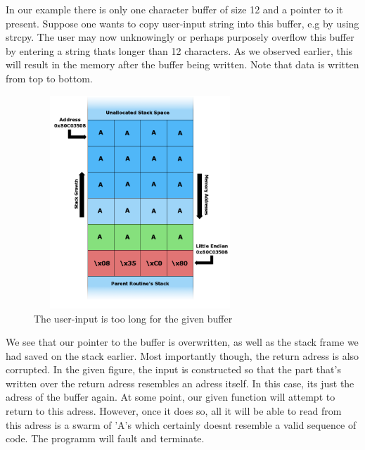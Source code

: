 \documentclass[10pt,twocolumn,a4paper]{article}
\begin{document}
In our example there is only one character buffer of size 12 and a pointer to it present.
\newline Suppose one wants to copy user-input string into this buffer, e.g by using strcpy.
The user may now unknowingly or perhaps purposely overflow this buffer by entering a string thats longer than 12 characters.
As we observed earlier, this will result in the memory after the buffer being written. Note that data is written from top to bottom.
\begin{figure}
\includegraphics[height=8cm,width=8cm]{fig/Stack_Overflow2}
\caption{The user-input is too long for the given buffer}
\end{figure}
We see that our pointer to the buffer is overwritten, as well as the stack frame we had saved on the stack earlier. Most importantly though, the return adress is also corrupted.
In the given figure, the input is constructed so that the part that's written over the return adress resembles an adress itself. In this case, its just the adress of the buffer again.
At some point, our given function will attempt to return to this adress. However, once it does so, all it will be able to read from this adress is a swarm of  'A's which certainly doesnt resemble a valid sequence of code. The programm will fault and terminate.

\end{document}
